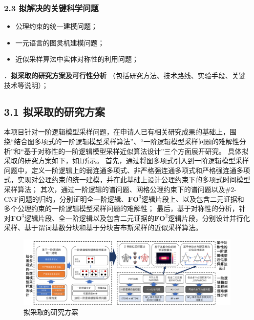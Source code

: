 \documentclass[12pt,UTF8,AutoFakeBold=3,a4paper]{ctexart} %
\newcommand{\fotwo}{\ensuremath{\mathbf{FO}^2}}
\newcommand{\fothree}{\ensuremath{\mathbf{FO}^3}}
\begin{document}
\subsubsection{2.3 拟解决的关键科学问题}

\begin{itemize}
  \item 公理约束的统一建模问题；
  \item 一元语言的图灵机建模问题；
  \item 近似采样算法中实体对称性的利用问题；
\end{itemize}


\newpage

{\sihao \color{MsBlue} ．{\bfseries 拟采取的研究方案及可行性分析} （包括研究方法、技术路线、实验手段、关键技术等说明）；}

\subsection{3.1 拟采取的研究方案}

本项目针对一阶逻辑模型采样问题，在申请人已有相关研究成果的基础上，围绕``结合图多项式的一阶逻辑模型采样算法''、``一阶逻辑模型采样问题的难解性分析''和``基于对称性的一阶逻辑模型采样近似算法设计''三个方面展开研究。
具体拟采取的研究方案如下，如\cref{fig:plan}所示。
首先，通过将图多项式引入到一阶逻辑模型采样问题中，定义一阶逻辑上的弱连通多项式、非严格强连通多项式和严格强连通多项式，实现对公理约束的统一建模，并在此基础上设计公理约束下的多项式时间模型采样算法；
其次，通过一阶逻辑的谱问题、网格公理约束下的谱问题以及$\#2$-CNF问题的归约，分别证明全一阶逻辑、\fothree{}逻辑片段上、以及包含二元证据和多个公理约束的一阶逻辑模型采样问题的难解性；
最后，基于对称性的分析，针对\fothree{}逻辑片段、全一阶逻辑以及包含二元证据的\fotwo{}逻辑片段，分别设计并行化采样、基于谓词基数分块和基于分块吉布斯采样的近似采样算法。



\begin{figure}[H]
  \centering
  \includegraphics[width=\textwidth]{figs/plan.pdf}
  \caption{拟采取的研究方案}
  \label{fig:plan}
\end{figure}
\end{document}
